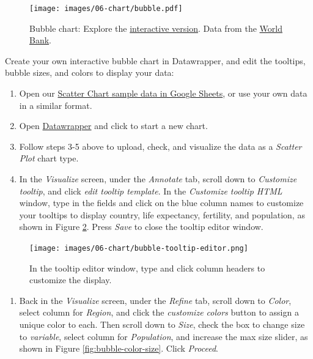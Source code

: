 \documentclass[
  english,
]{book}
\providecommand{\tightlist}{%
  \setlength{\itemsep}{0pt}\setlength{\parskip}{0pt}}
\begin{document}
\begin{figure}
\centering
\texttt{[image: images/06-chart/bubble.pdf]}
\caption{\label{fig:bubble}Bubble chart: Explore the \href{https://datawrapper.dwcdn.net/ZX9QR/}{interactive version}. Data from the \href{https://docs.google.com/spreadsheets/d/1yiZ975_uXOTOd0OCAdrR_s-bQFs7za3dar69IXPo6Xg}{World Bank}.}
\end{figure}

Create your own interactive bubble chart in Datawrapper, and edit the tooltips, bubble sizes, and colors to display your data:

\begin{enumerate}
\def\labelenumi{\arabic{enumi}.}
\item
  Open our \href{https://docs.google.com/spreadsheets/d/1yiZ975_uXOTOd0OCAdrR_s-bQFs7za3dar69IXPo6Xg/edit\#gid=0}{Scatter Chart sample data in Google Sheets}, or use your own data in a similar format.
\item
  Open \href{https://www.datawrapper.de}{Datawrapper} and click to start a new chart.
\item
  Follow steps 3-5 above to upload, check, and visualize the data as a \emph{Scatter Plot} chart type.
\item
  In the \emph{Visualize} screen, under the \emph{Annotate} tab, scroll down to \emph{Customize tooltip}, and click \emph{edit tooltip template}. In the \emph{Customize tooltip HTML} window, type in the fields and click on the blue column names to customize your tooltips to display country, life expectancy, fertility, and population, as shown in Figure \ref{fig:bubble-tooltip-editor}. Press \emph{Save} to close the tooltip editor window.
\end{enumerate}



\begin{figure}
\centering
\texttt{[image: images/06-chart/bubble-tooltip-editor.png]}
\caption{\label{fig:bubble-tooltip-editor}In the tooltip editor window, type and click column headers to customize the display.}
\end{figure}

\begin{enumerate}
\def\labelenumi{\arabic{enumi}.}
\setcounter{enumi}{4}
\tightlist
\item
  Back in the \emph{Visualize} screen, under the \emph{Refine} tab, scroll down to \emph{Color}, select column for \emph{Region}, and click the \emph{customize colors} button to assign a unique color to each. Then scroll down to \emph{Size}, check the box to change size to \emph{variable}, select column for \emph{Population}, and increase the max size slider, as shown in Figure \ref{fig:bubble-color-size}. Click \emph{Proceed}.
\end{enumerate}
\end{document}
